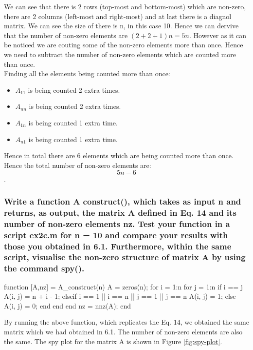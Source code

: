 \documentclass[unicode,11pt,a4paper,oneside,numbers=endperiod,openany]{scrartcl}
\begin{document}
We can see that there is 2 rows (top-most and bottom-most) which are non-zero, there are 2 columns (left-most and right-most) and at last there is a diagnol matrix. We can see the size of there is n, in this case 10. Hence we can dervive that the number of non-zero elements are $(2 + 2 + 1)n = 5n$. However as it can be noticed we are couting some of the non-zero elements more than once. Hence we need to subtract the number of non-zero elements which are counted more than once. \\

Finding all the elements being counted more than once:

\begin{itemize}
    \item $A_{11}$ is being counted 2 extra times.
    \item $A_{nn}$ is being counted 2 extra times.
    \item $A_{1n}$ is being counted 1 extra time.
    \item $A_{n1}$ is being counted 1 extra time.
\end{itemize}

Hence in total there are 6 elements which are being counted more than once. Hence the total number of non-zero elements are: $$5n - 6$$.

\subsubsection{Write a function A construct(), which takes as input n and returns, as output, the matrix A defined in Eq. 14 and its number of non-zero elements nz. Test your function in a script ex2c.m for n = 10 and compare your results with those you obtained in 6.1. Furthermore, within the same script, visualise the non-zero structure of matrix A by using the command spy().}

\begin{mcode}
    function [A,nz] = A_construct(n)
    A = zeros(n);       %
    for i = 1:n         %
    for j = 1:n     %
    if i == j
    A(i, j) = n + i - 1;
    elseif i == 1 || i == n || j == 1 || j == n
    A(i, j) = 1;
    else
    A(i, j) = 0;
    end
    end
    end
    nz = nnz(A);
    end
\end{mcode}

By running the above function, which replicates the Eq. 14, we obtained the same matrix which we had obtained in 6.1. The number of non-zero elements are also the same. The spy plot for the matrix A is shown in Figure \ref{fig:spy-plot}.
\end{document}
